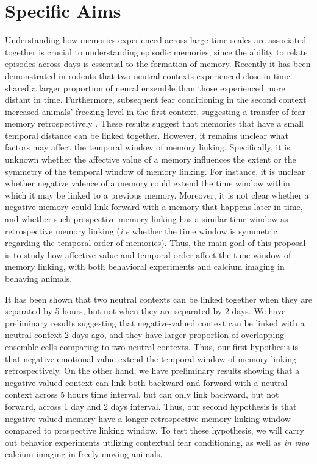 \documentclass[master.tex]{subfiles}
\begin{document}
\section*{Specific Aims}

Understanding how memories experienced across large time scales are associated
together is crucial to understanding episodic memories, since the ability to
relate episodes across days is essential to the formation of memory. Recently it
has been demonstrated in rodents that two neutral contexts experienced close in
time shared a larger proportion of neural ensemble than those experienced more
distant in time. Furthermore, subsequent fear conditioning in the second context
increased animals' freezing level in the first context, suggesting a transfer of
fear memory retrospectively \cite{cai_shared_2016}. These results suggest that
memories that have a small temporal distance can be linked together. However, it
remains unclear what factors may affect the temporal window of memory linking.
Specifically, it is unknown whether the affective value of a memory influences
the extent or the symmetry of the temporal window of memory linking. For
instance, it is unclear whether negative valence of a memory could extend the
time window within which it may be linked to a previous memory. Moreover, it is
not clear whether a negative memory could link forward with a memory that
happens later in time, and whether such prospective memory linking has a similar
time window as retrospective memory linking (\textit{i.e} whether the time
window is symmetric regarding the temporal order of memories). Thus, the main
goal of this proposal is to study how affective value and temporal order affect
the time window of memory linking, with both behavioral experiments and calcium
imaging in behaving animals.

It has been shown that two neutral contexts can be linked together when they are
separated by 5 hours, but not when they are separated by 2 days. We have
preliminary results suggesting that negative-valued context can be linked with a
neutral context 2 days ago, and they have larger proportion of overlapping
ensemble cells comparing to two neutral contexts. Thus, our first hypothesis is
that negative emotional value extend the temporal window of memory linking
retrospectively. On the other hand, we have preliminary results showing that a
negative-valued context can link both backward and forward with a neutral
context across 5 hours time interval, but can only link backward, but not
forward, across 1 day and 2 days interval. Thus, our second hypothesis is that
negative-valued memory have a longer retrospective memory linking window
compared to prospective linking window. To test these hypothesis, we will carry
out behavior experiments utilizing contextual fear conditioning, as well as
\textit{in vivo} calcium imaging in freely moving animals.
\end{document}
